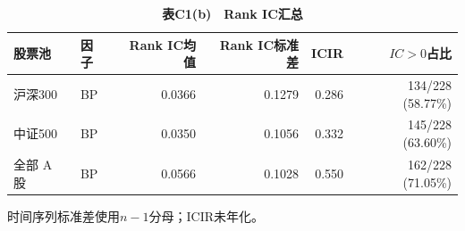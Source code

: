 \begingroup\small\setlength{\tabcolsep}{4pt}
\begin{table}[H]\centering
\caption*{\textbf{表C1(b)　Rank IC汇总}}
\begin{tabular*}{\textwidth}{@{\extracolsep{\fill}}llrrrr@{}}\toprule
股票池 & 因子 & Rank IC均值 & Rank IC标准差 & ICIR & $IC>0$占比 \\ \midrule
沪深300 & BP & 0.0366 & 0.1279 & 0.286 & 134/228 (58.77\%) \\
中证500 & BP & 0.0350 & 0.1056 & 0.332 & 145/228 (63.60\%) \\
全部 A 股 & BP & 0.0566 & 0.1028 & 0.550 & 162/228 (71.05\%) \\
\bottomrule\end{tabular*}
\par\smallskip\raggedright\footnotesize 时间序列标准差使用$n-1$分母；ICIR未年化。\end{table}
\endgroup
